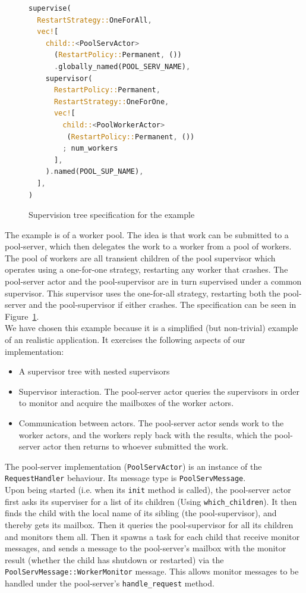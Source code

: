 \documentclass[a4paper]{article}
\newcommand\figref[1]{Figure~\ref{#1}}
\begin{document}
\begin{figure}
\begin{lstlisting}[language=Rust,basicstyle=\footnotesize]
supervise(
  RestartStrategy::OneForAll,
  vec![
    child::<PoolServActor>
      (RestartPolicy::Permanent, ())
      .globally_named(POOL_SERV_NAME),
    supervisor(
      RestartPolicy::Permanent,
      RestartStrategy::OneForOne,
      vec![
        child::<PoolWorkerActor>
         (RestartPolicy::Permanent, ())
        ; num_workers
      ],
    ).named(POOL_SUP_NAME),
  ],
)
\end{lstlisting}
  \caption{Supervision tree specification for the example}
  \label{fig:ex-spec}
\end{figure}

\noindent
The example is of a worker pool. The idea is that work can be submitted to a
pool-server, which then delegates the work to a worker from a pool of workers.
The pool of workers are all transient children of the pool supervisor which
operates using a one-for-one strategy, restarting any worker that crashes. The
pool-server actor and the pool-supervisor are in turn supervised under a common
supervisor. This supervisor uses the one-for-all strategy, restarting both the
pool-server and the pool-supervisor if either crashes. The specification can be
seen in \figref{fig:ex-spec}.\\

\noindent
We have chosen this example because it is a simplified (but non-trivial) example
of an realistic application. It exercises the following aspects of our
implementation:
\begin{itemize}
\item A supervisor tree with nested supervisors
\item Supervisor interaction. The pool-server actor queries the supervisors in order
  to monitor and acquire the mailboxes of the worker actors.
\item Communication between actors. The pool-server actor sends work to the
  worker actors, and the workers reply back with the results, which the
  pool-server actor then returns to whoever submitted the work.
\end{itemize}

\noindent
The pool-server implementation (\texttt{PoolServActor}) is an instance of the
\texttt{RequestHandler} behaviour. Its message type is
\texttt{PoolServMessage}.\\

\noindent
Upon being started (i.e. when its \texttt{init} method
is called), the pool-server actor first asks its superviser for a list of its
children (Using \texttt{which\_children}). It then finds the child with the
local name of its sibling (the pool-supervisor), and thereby gets its mailbox.
Then it queries the pool-supervisor for all its children and monitors them all.
Then it spawns a task for each child that receive monitor messages, and sends a
message to the pool-server's mailbox with the monitor result (whether the child
has shutdown or restarted) via the \texttt{{PoolServMessage::WorkerMonitor}}
message. This allows monitor messages to be handled under the pool-server's
\texttt{handle\_request} method.\\
\end{document}
